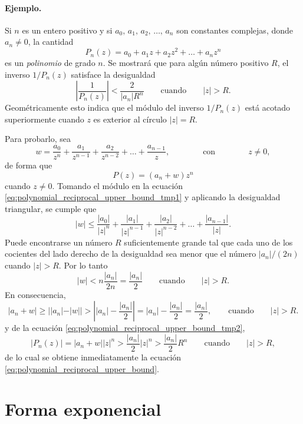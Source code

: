\documentclass[a4paper]{report}
\begin{document}
\paragraph{Ejemplo.} Si \(n\) es un entero positivo y si \(a_0,\,a_1,\,a_2,\,\dots,\,a_n\) son constantes complejas, donde \(a_n\neq0\), la cantidad
\[
 P_n(z)=a_0+a_1z+a_2z^2+\dots+a_nz^n
\]
es un \emph{polinomio} de grado \(n\). Se mostrará que para algún número positivo \(R\), el inverso \(1/P_n(z)\) satisface la desigualdad
\begin{equation}\label{eq:polynomial_reciprocal_upper_bound}
  \left|\frac{1}{P_n(z)}\right|<\frac{2}{|a_n|R^n}
 \qquad\textrm{cuando}\qquad 
 |z|>R.
\end{equation}
Geométricamente esto indica que el módulo del inverso \(1/P_n(z)\) está acotado superiormente cuando \(z\) es exterior al círculo \(|z|=R\).

Para probarlo, sea 
\begin{equation}\label{eq:polynomial_reciprocal_upper_bound_tmp1}
 w=\frac{a_0}{z^n}+\frac{a_1}{z^{n-1}}+\frac{a_2}{z^{n-2}}+\dots+\frac{a_{n-1}}{z},
 \qquad\qquad\textrm{con}\qquad\qquad 
 z\neq0, 
\end{equation}
de forma que 
\begin{equation}\label{eq:polynomial_reciprocal_upper_bound_tmp2}
 P(z)=(a_n+w)z^n 
\end{equation}
cuando \(z\neq0\). Tomando el módulo en la ecuación \ref{eq:polynomial_reciprocal_upper_bound_tmp1} y aplicando la desigualdad triangular, se cumple que 
\[
 |w|\leq\frac{|a_0|}{|z|^n}+\frac{|a_1|}{|z|^{n-1}}+\frac{|a_2|}{|z|^{n-2}}+\dots+\frac{|a_{n-1}|}{|z|}.
\]
Puede encontrarse un número \(R\) suficientemente grande tal que cada uno de los cocientes del lado derecho de la desigualdad sea menor que el número \(|a_n|/(2n)\) cuando \(|z|>R\). Por lo tanto
\[
 |w|<n\frac{|a_n|}{2n}=\frac{|a_n|}{2}
 \qquad\textrm{cuando}\qquad 
 |z|>R.
\]
En consecuencia,
\[
 |a_n+w|\geq||a_n|-|w||>\left||a_n|-\frac{|a_n|}{2}\right|=|a_n|-\frac{|a_n|}{2}=\frac{|a_n|}{2},
 \qquad\textrm{cuando}\qquad 
 |z|>R.
\]
y de la ecuación \ref{eq:polynomial_reciprocal_upper_bound_tmp2},
\[
 |P_n(z)|=|a_n+w||z|^n>\frac{|a_n|}{2}|z|^n>\frac{|a_n|}{2}R^n 
 \qquad\textrm{cuando}\qquad 
 |z|>R,
\]
de lo cual se obtiene inmediatamente la ecuación \ref{eq:polynomial_reciprocal_upper_bound}.

\section{Forma exponencial}\label{sec:exponential_form}
\end{document}
